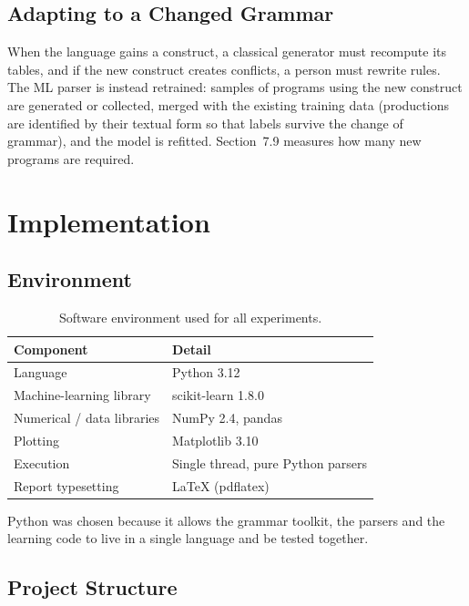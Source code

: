 \documentclass[12pt,a4paper]{article}
\begin{document}
\subsection{Adapting to a Changed Grammar}

When the language gains a construct, a classical generator must recompute its
tables, and if the new construct creates conflicts, a person must rewrite
rules. The ML parser is instead retrained: samples of programs using the new
construct are generated or collected, merged with the existing training data
(productions are identified by their textual form so that labels survive the
change of grammar), and the model is refitted. Section~7.9 measures how many
new programs are required.

\newpage
\section{Implementation}

\subsection{Environment}

\begin{table}[H]
\centering
\caption{Software environment used for all experiments.}
\label{tab:env}
\begin{tabular}{ll}
\toprule
\textbf{Component} & \textbf{Detail}\\
\midrule
Language & Python 3.12\\
Machine-learning library & scikit-learn 1.8.0\\
Numerical / data libraries & NumPy 2.4, pandas\\
Plotting & Matplotlib 3.10\\
Execution & Single thread, pure Python parsers\\
Report typesetting & \LaTeX{} (pdflatex)\\
\bottomrule
\end{tabular}
\end{table}

Python was chosen because it allows the grammar toolkit, the parsers and the
learning code to live in a single language and be tested together.

\subsection{Project Structure}
\end{document}
